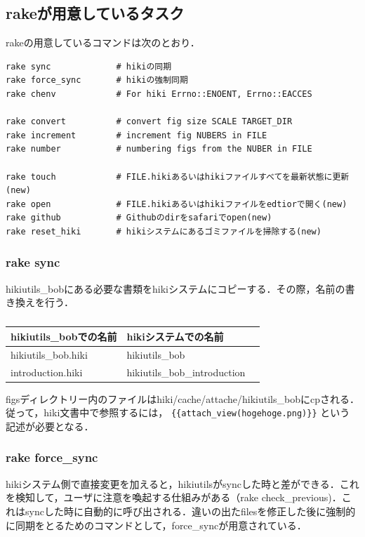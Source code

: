 \subsection{rakeが用意しているタスク}
rakeの用意しているコマンドは次のとおり．
\begin{lstlisting}[style=customCsh,basicstyle={\scriptsize\ttfamily}]
rake sync             # hikiの同期
rake force_sync       # hikiの強制同期
rake chenv            # For hiki Errno::ENOENT, Errno::EACCES

rake convert          # convert fig size SCALE TARGET_DIR
rake increment        # increment fig NUBERS in FILE
rake number           # numbering figs from the NUBER in FILE

rake touch            # FILE.hikiあるいはhikiファイルすべてを最新状態に更新(new)
rake open             # FILE.hikiあるいはhikiファイルをedtiorで開く(new)
rake github           # Githubのdirをsafariでopen(new)
rake reset_hiki       # hikiシステムにあるゴミファイルを掃除する(new)
\end{lstlisting}
\subsubsection{rake sync}
hikiutils\_bobにある必要な書類をhikiシステムにコピーする．その際，名前の書き換えを行う．

\begin{table}[htbp]\begin{center}
\caption{}
\begin{tabular}{lll}
\hline
hikiutils\_bobでの名前   &hikiシステムでの名前  \\ \hline
hikiutils\_bob.hiki   &hikiutils\_bob  \\
introduction.hiki   &hikiutils\_bob\_introduction  \\
\hline
\end{tabular}
\label{default}
\end{center}\end{table}

figsディレクトリー内のファイルはhiki/cache/attache/hikiutils\_bobにcpされる．従って，hiki文書中で参照するには，
\verb|{{attach_view(hogehoge.png)}}|
という記述が必要となる．

\subsubsection{rake force\_sync}
hikiシステム側で直接変更を加えると，hikiutilsがsyncした時と差ができる．これを検知して，ユーザに注意を喚起する仕組みがある（rake check\_previous)．これはsyncした時に自動的に呼び出される．違いの出たfilesを修正した後に強制的に同期をとるためのコマンドとして，force\_syncが用意されている．

